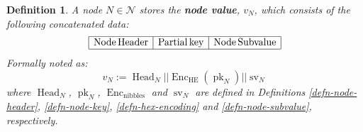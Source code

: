 \documentclass{book}
\newcommand{\assign}{:=}
\newcommand{\tmop}[1]{\ensuremath{\operatorname{#1}}}
\newcommand{\tmstrong}[1]{\textbf{#1}}
\newtheorem{definition}{Definition}
\newtheorem{definition}{Definition}
\begin{document}
\begin{definition}
  \label{defn-node-value}A node $N \in \mathcal{N}$ stores the {\tmstrong{node
  value}}, {\tmstrong{$v_N$}}, which consists of the following concatenated
  data:
  \[ \begin{array}{|l|l|l|}
       \hline
       \tmop{Node} \tmop{Header} & \tmop{Partial} \tmop{key} & \tmop{Node}
       \tmop{Subvalue}\\
       \hline
     \end{array} \]
  Formally noted as:
  \[ v_N \assign \tmop{Head}_N | | \tmop{Enc}_{\tmop{HE}} (\tmop{pk}_N) | |
     \tmop{sv}_N \]
  where $\tmop{Head}_N$, $\tmop{pk}_N$, $\tmop{Enc}_{\tmop{nibbles}}$ and
  $\tmop{sv}_N$ are defined in Definitions \ref{defn-node-header},
  \ref{defn-node-key}, \ref{defn-hex-encoding} and \ref{defn-node-subvalue},
  respectively.
\end{definition}
\end{document}
